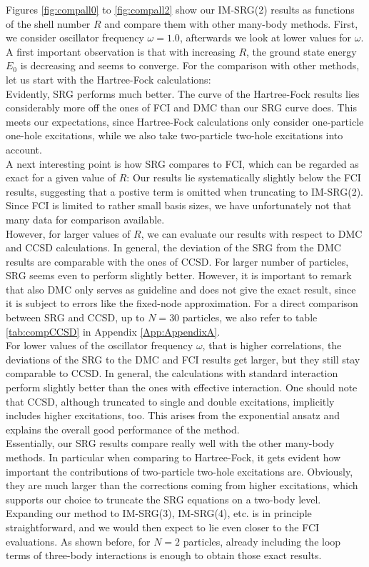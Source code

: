 Figures \ref{fig:compall0} to \ref{fig:compall2} show our IM-SRG(2) results as functions of the shell number $R$ and compare them with other many-body methods. First, we consider oscillator frequency $\omega=1.0$, afterwards we look at lower values for $\omega$.\\
A first important observation is that with increasing $R$, the ground state energy $E_0$ is decreasing and seems to converge.
For the comparison with other methods, let us start with the Hartree-Fock calculations:\\
Evidently, SRG performs much better. The curve of the Hartree-Fock results lies considerably more off the ones of FCI and DMC than our SRG curve does. This meets our expectations, since Hartree-Fock calculations only consider one-particle one-hole excitations, while we also take two-particle two-hole excitations into account. \\
A next interesting point is how SRG compares to FCI, which can be regarded as exact for a given value of $R$: Our results lie systematically slightly below the FCI results, suggesting that a postive term is omitted when truncating to IM-SRG(2). Since FCI is limited to rather small basis sizes, we have unfortunately not that many data for comparison available. \\
However, for larger values of $R$, we can evaluate our results with respect to DMC and CCSD calculations. In general, the deviation of the SRG from the DMC results are comparable with the ones of CCSD. For larger number of particles, SRG seems even to perform slightly better. However, it is important to remark that also DMC only serves as  guideline and does not give the exact result, since it is subject to errors like the fixed-node approximation. For a direct comparison between SRG and CCSD, up to $N=30$ particles, we also refer to table \ref{tab:compCCSD} in Appendix \ref{App:AppendixA}. \\
For lower values of the oscillator frequency $\omega$, that is higher correlations, the deviations of the SRG to the DMC and FCI results get larger, but they still stay comparable to CCSD. In general, the calculations with standard interaction perform slightly better than the ones with effective interaction. One should note that CCSD, although truncated to single and double excitations, implicitly includes higher excitations, too. This arises from the exponential ansatz and explains the overall good performance of the method. \\
Essentially, our SRG results compare really well with  the other many-body methods. In particular when comparing to Hartree-Fock, it gets evident how important the contributions of two-particle two-hole excitations are. Obviously, they are much larger than the corrections coming from higher excitations, which supports our choice to truncate the SRG equations on a two-body level. Expanding our method to IM-SRG(3), IM-SRG(4), etc. is in principle straightforward, and we would then expect to lie even closer to the FCI evaluations. As shown before, for $N=2$ particles, already including the loop terms of three-body interactions is enough to obtain those exact results. \\
